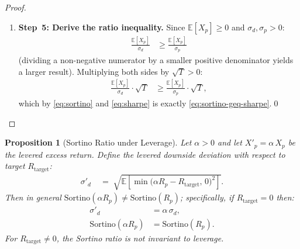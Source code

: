 \documentclass[12pt,openany]{book}
\newcommand{\E}{\mathbb{E}}
\numberwithin{equation}{chapter}
\theoremstyle{plain}
\newtheorem{proposition}[theorem]{Proposition}
\theoremstyle{definition}
\theoremstyle{remark}
\numberwithin{equation}{chapter}
\theoremstyle{plain}
\begin{document}
\begin{proof}
\begin{enumerate}
  \item \textbf{Step~5: Derive the ratio inequality.}
        Since $\E[X_p] \geq 0$ and $\sigma_d, \sigma_p > 0$:
        \begin{align}
          \frac{\E[X_p]}{\sigma_d}
            &\geq \frac{\E[X_p]}{\sigma_p}
          \label{eq:ineq-step10}
        \end{align}
        (dividing a non-negative numerator by a smaller
        positive denominator yields a larger result).
        Multiplying both sides by $\sqrt{T} > 0$:
        \begin{align}
          \frac{\E[X_p]}{\sigma_d}\cdot\sqrt{T}
            &\geq \frac{\E[X_p]}{\sigma_p}\cdot\sqrt{T},
          \label{eq:ineq-step11}
        \end{align}
        which by \eqref{eq:sortino} and \eqref{eq:sharpe}
        is exactly \eqref{eq:sortino-geq-sharpe}.\qed
\end{enumerate}
\end{proof}

\begin{proposition}[Sortino Ratio under Leverage]
\label{prop:sortino-leverage}
Let $\alpha > 0$ and let $X'_p = \alpha\,X_p$ be the
levered excess return.  Define the levered downside
deviation with respect to target $R_{\mathrm{target}}$:
\begin{align}
  \sigma'_d
    &\;=\; \sqrt{\E\!\left[
             \min\!\bigl(\alpha R_p - R_{\mathrm{target}},\,0
             \bigr)^{2}\right]}.
  \label{eq:sortino-lev-sigmad}
\end{align}
Then in general $\mathrm{Sortino}(\alpha R_p)
\neq \mathrm{Sortino}(R_p)$; specifically, if
$R_{\mathrm{target}} = 0$ then:
\begin{align}
  \sigma'_d
    &= \alpha\,\sigma_d,
  \label{eq:sortino-lev-std} \\
  \mathrm{Sortino}(\alpha R_p)
    &= \mathrm{Sortino}(R_p). \label{eq:sortino-lev-inv}
\end{align}
For $R_{\mathrm{target}} \neq 0$, the Sortino ratio is
\emph{not} invariant to leverage.
\end{proposition}
\end{document}
